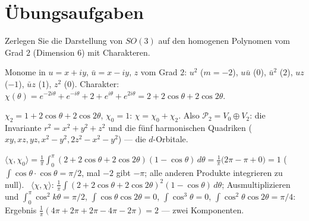 \section{Übungsaufgaben}

\begin{aufgabe}
Zerlegen Sie die Darstellung von $SO(3)$ auf den homogenen Polynomen vom Grad $2$ (Dimension $6$) mit Charakteren.

\loesung
{}
Monome in $u = x + iy$, $\bar u = x - iy$, $z$ vom Grad $2$: $u^{2}$ ($m = -2$), $u\bar u$ ($0$), $\bar u^{2}$ ($2$), $uz$ ($-1$), $\bar uz$ ($1$), $z^{2}$ ($0$). Charakter: $\chi(\theta) = e^{-2i\theta} + e^{-i\theta} + 2 + e^{i\theta} + e^{2i\theta} = 2 + 2\cos\theta + 2\cos2\theta$.

$\chi_2 = 1 + 2\cos\theta + 2\cos2\theta$, $\chi_0 = 1$: $\chi = \chi_0 + \chi_2$. Also $\mathcal P_2 = V_0\oplus V_2$: die Invariante $r^{2} = x^{2} + y^{2} + z^{2}$ und die fünf harmonischen Quadriken ($xy, xz, yz, x^{2} - y^{2}, 2z^{2} - x^{2} - y^{2}$) --- die $d$-Orbitale.

$\langle\chi, \chi_0\rangle = \frac1\pi\int_0^{\pi}(2 + 2\cos\theta + 2\cos2\theta)(1 - \cos\theta)\,d\theta = \frac1\pi\bigl(2\pi - \pi + 0\bigr) = 1$ ($\int\cos\theta\cdot\cos\theta = \pi/2$, mal $-2$ gibt $-\pi$; alle anderen Produkte integrieren zu null). \checkmark\ $\langle\chi, \chi\rangle$: $\frac1\pi\int(2 + 2\cos\theta + 2\cos2\theta)^{2}(1 - \cos\theta)\,d\theta$; Ausmultiplizieren und $\int_0^\pi\cos^{2}k\theta = \pi/2$, $\int\cos\theta\cos2\theta = 0$, $\int\cos^{3}\theta = 0$, $\int\cos^{2}\theta\cos2\theta = \pi/4$: Ergebnis $\frac1\pi(4\pi + 2\pi + 2\pi - 4\pi - 2\pi) = 2$ --- zwei Komponenten. \checkmark

\begin{center}
\begin{minipage}{0.88\textwidth}
\end{minipage}
\end{center}
\end{aufgabe}

